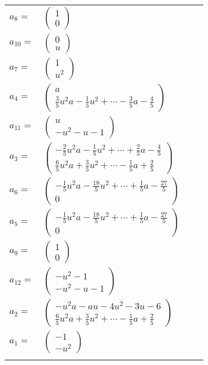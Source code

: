 \documentclass[1p]{elsarticle_modified}
\theoremstyle{definition}
\begin{document}
\begin{tabular}{m{7pt} m{180pt} m{7pt} m{180pt} }
\flushright $a_{8}=$&$\begin{pmatrix}1\\0\end{pmatrix}$ \\
\flushright $a_{10}=$&$\begin{pmatrix}0\\u\end{pmatrix}$ \\
\flushright $a_{7}=$&$\begin{pmatrix}1\\u^2\end{pmatrix}$ \\
\flushright $a_{4}=$&$\begin{pmatrix}a\\\frac{3}{5} u^2 a-\frac{1}{5} u^2+\cdots-\frac{3}{5} a-\frac{4}{5}\end{pmatrix}$ \\
\flushright $a_{11}=$&$\begin{pmatrix}u\\- u^2- u-1\end{pmatrix}$ \\
\flushright $a_{3}=$&$\begin{pmatrix}-\frac{2}{5} u^2 a-\frac{1}{5} u^2+\cdots+\frac{2}{5} a-\frac{4}{5}\\\frac{6}{5} u^2 a+\frac{3}{5} u^2+\cdots-\frac{1}{5} a+\frac{2}{5}\end{pmatrix}$ \\
\flushright $a_{6}=$&$\begin{pmatrix}-\frac{1}{5} u^2 a-\frac{18}{5} u^2+\cdots+\frac{1}{5} a-\frac{27}{5}\\0\end{pmatrix}$ \\
\flushright $a_{5}=$&$\begin{pmatrix}-\frac{1}{5} u^2 a-\frac{18}{5} u^2+\cdots+\frac{1}{5} a-\frac{27}{5}\\0\end{pmatrix}$ \\
\flushright $a_{9}=$&$\begin{pmatrix}1\\0\end{pmatrix}$ \\
\flushright $a_{12}=$&$\begin{pmatrix}- u^2-1\\- u^2- u-1\end{pmatrix}$ \\
\flushright $a_{2}=$&$\begin{pmatrix}- u^2 a- a u-4 u^2-3 u-6\\\frac{6}{5} u^2 a+\frac{3}{5} u^2+\cdots-\frac{1}{5} a+\frac{2}{5}\end{pmatrix}$ \\
\flushright $a_{1}=$&$\begin{pmatrix}-1\\- u^2\end{pmatrix}$\\&\end{tabular}
\end{document}

